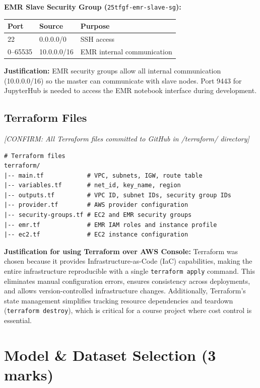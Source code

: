\documentclass[11pt,a4paper]{article}
\begin{document}
\textbf{EMR Slave Security Group (}\texttt{25tfgf-emr-slave-sg}\textbf{):}
\begin{table}[H]
\centering
\begin{tabular}{@{}lll@{}}
\toprule
\textbf{Port} & \textbf{Source} & \textbf{Purpose} \\
\midrule
22 & 0.0.0.0/0 & SSH access \\
0--65535 & 10.0.0.0/16 & EMR internal communication \\
\bottomrule
\end{tabular}
\end{table}

\textbf{Justification:} EMR security groups allow all internal communication (10.0.0.0/16) so the master can communicate with slave nodes. Port 9443 for JupyterHub is needed to access the EMR notebook interface during development.

\subsection{Terraform Files}

\textit{[CONFIRM: All Terraform files committed to GitHub in /terraform/ directory]}

\begin{lstlisting}[style=bash]
# Terraform files
terraform/
|-- main.tf            # VPC, subnets, IGW, route table
|-- variables.tf       # net_id, key_name, region
|-- outputs.tf         # VPC ID, subnet IDs, security group IDs
|-- provider.tf        # AWS provider configuration
|-- security-groups.tf # EC2 and EMR security groups
|-- emr.tf             # EMR IAM roles and instance profile
|-- ec2.tf             # EC2 instance configuration
\end{lstlisting}

\textbf{Justification for using Terraform over AWS Console:} Terraform was chosen because it provides Infrastructure-as-Code (IaC) capabilities, making the entire infrastructure reproducible with a single \texttt{terraform apply} command. This eliminates manual configuration errors, ensures consistency across deployments, and allows version-controlled infrastructure changes. Additionally, Terraform's state management simplifies tracking resource dependencies and teardown (\texttt{terraform destroy}), which is critical for a course project where cost control is essential.

\section{Model \& Dataset Selection (3 marks)}
\end{document}
